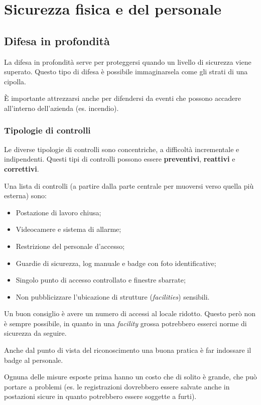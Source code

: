 \part{Sicurezza fisica e del personale}
\label{SFDP}
\chapter{Difesa in profondità}

La difesa in profondità serve per proteggersi quando un livello di sicurezza
viene superato. Questo tipo di difesa è possibile immaginarsela come gli strati
di una cipolla.

È importante attrezzarsi anche per difendersi da eventi che possono accadere
all'interno dell'azienda (es. incendio).

\section{Tipologie di controlli}

Le diverse tipologie di controlli sono concentriche, a difficoltà incrementale e
indipendenti. Questi tipi di controlli possono essere \textbf{preventivi},
\textbf{reattivi} e \textbf{correttivi}.

Una lista di controlli (a partire dalla parte centrale per muoversi
verso quella più esterna) sono:

\begin{itemize}
\item Postazione di lavoro chiusa;
\item Videocamere e sistema di allarme;
\item Restrizione del personale d'accesso;
\item Guardie di sicurezza, log manuale e badge con foto identificative;
\item Singolo punto di accesso controllato e finestre sbarrate;
\item Non pubblicizzare l'ubicazione di strutture (\textit{facilities})
sensibili.
\end{itemize}

Un buon consiglio è avere un numero di accessi al locale ridotto. Questo però
non è sempre possibile, in quanto in una \textit{facility} grossa potrebbero
esserci norme di sicurezza da seguire.

Anche dal punto di vista del riconoscimento una buona pratica è
far indossare il badge al personale.

Ognuna delle misure esposte prima hanno un costo che di solito è grande, che
può portare a problemi (es. le registrazioni dovrebbero essere
salvate anche in postazioni sicure in quanto potrebbero essere soggette a furti).

